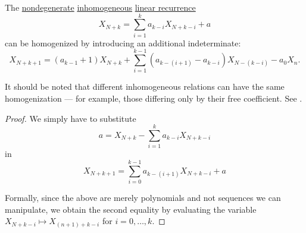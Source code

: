 \begin{proposition}\label{thm:linear_recurrence_relation_homogenization}
  The \hyperref[def:recurrence_relation/degenerate]{nondegenerate} \hyperref[def:homogeneous_linear_recurrence]{inhomogeneous} \hyperref[def:linear_recurrence]{linear recurrence}
  \begin{equation*}
    X_{N+k} = \sum_{i=1}^k a_{k-i} X_{N+k-i} + a
  \end{equation*}
  can be homogenized by introducing an additional indeterminate:
  \begin{equation}\label{eq:thm:linear_recurrence_relation_homogenization}
    X_{N+k+1}
    =
    (a_{k-1} + 1) X_{N+k} + \sum_{i=1}^{k-1} (a_{k-(i+1)} - a_{k-i}) X_{N-(k-i)} - a_0 X_n.
  \end{equation}
\end{proposition}
\begin{comments}
  \item It should be noted that different inhomogeneous relations can have the same homogenization --- for example, those differing only by their free coefficient. See .
\end{comments}
\begin{proof}
  We simply have to substitute
  \begin{equation*}
    a = X_{N+k} - \sum_{i=1}^k a_{k-i} X_{N+k-i}
  \end{equation*}
  in
  \begin{equation*}
    X_{N+k+1} = \sum_{i=0}^{k-1} a_{k-(i+1)} X_{N+k-i} + a
  \end{equation*}

  Formally, since the above are merely polynomials and not sequences we can manipulate, we obtain the second equality by evaluating the variable \( X_{N+k-i} \mapsto X_{(n+1)+k-i} \) for \( i = 0, \ldots, k \).
\end{proof}

